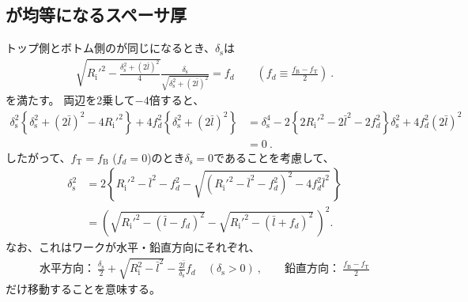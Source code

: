 \subsection{\ReAlocationLength が均等になるスペーサ厚}
トップ側とボトム側の\AlocationLength が同じになるとき、$\delta_\mathrm s$は
\begin{align*}
  \sqrt{R_\mathrm i'^2-\frac{\delta_\mathrm s^2+(2\bar l)^2}4}\frac{\delta_\mathrm s}{\sqrt{\delta_\mathrm s^2+(2\bar l)^2}} = f_d \qquad
  \left(f_d \equiv \frac{f_\mathrm B-f_\mathrm T}2\right)\ .
\end{align*}
を満たす。
両辺を2乗して$-4$倍すると、
\begin{align*}
  \delta_\mathrm s^2\left\{\delta_\mathrm s^2+(2\bar l)^2-4R_\mathrm i'^2\right\}+4f_d^2\left\{\delta_\mathrm s^2+(2\bar l)^2\right\}
  & = \delta_\mathrm s^4-2\left\{2R_\mathrm i'^2-2\bar l^2-2f_d^2\right\}\delta_\mathrm s^2+4f_d^2(2\bar l)^2\\
  & = 0\ .
\end{align*}
したがって、$f_\mathrm T = f_\mathrm B$ ($f_d = 0$)のとき$\delta_\mathrm s = 0$であることを考慮して、
\begin{align*}
  \delta_\mathrm s^2
  &= 2\left\{
       R_\mathrm i'^2-\bar l^2-f_d^2-\sqrt{\left(R_\mathrm i'^2-\bar l^2-f_d^2\right)^2-4f_d^2\bar l^2}\,
     \right\}\\
  &= \left(\sqrt{R_\mathrm i'^2-(\bar l-f_d)^2}-\sqrt{R_\mathrm i'^2-(\bar l+f_d)^2}\,\right)^2.
\end{align*}
なお、これはワークが水平・鉛直方向にそれぞれ、
\begin{align*}
  \text{水平方向：}~\frac{\delta_\mathrm s}2+\sqrt{R_\mathrm i^2-\bar l^2}-\frac{2\bar l}{\delta_\mathrm s}f_d\quad(\delta_\mathrm s>0)\ , \qquad
  \text{鉛直方向：}~\frac{f_\mathrm B-f_\mathrm T}2
\end{align*}
だけ移動することを意味する。
